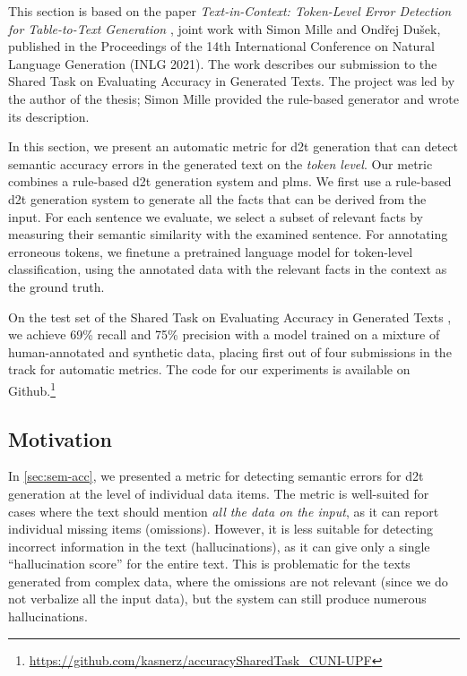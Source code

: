 \begin{refbox}
    This section is based on the paper \emph{Text-in-Context: Token-Level Error Detection for Table-to-Text Generation} \cite{kasnerTextinContextTokenLevelError2021}, joint work with Simon Mille and Ondřej Dušek, published in the Proceedings of the 14th International Conference on Natural Language Generation (INLG 2021). The work describes our submission to the Shared Task on Evaluating Accuracy in Generated Texts. The project was led by the author of the thesis; Simon Mille provided the rule-based generator and wrote its description.
\end{refbox}


In this section, we present an automatic metric for \ac{d2t} generation that can detect semantic accuracy errors in the generated text on the \emph{token level}. Our metric combines a rule-based \ac{d2t} generation system and \acp{plm}. We first use a rule-based \ac{d2t} generation system to generate all the facts that can be derived from the input. For each sentence we evaluate, we select a subset of relevant facts by measuring their semantic similarity with the examined sentence. For annotating erroneous tokens, we finetune a pretrained language model for token-level classification, using the annotated data with the relevant facts in the context as the ground truth.

On the test set of the Shared Task on Evaluating Accuracy in Generated Texts \cite{thomsonGenerationChallengesResults2021}, we achieve 69\% recall and 75\% precision with a model trained on a mixture of human-annotated and synthetic data, placing first out of four submissions in the track for automatic metrics. The code for our experiments is available on Github.\footnote{\url{https://github.com/kasnerz/accuracySharedTask_CUNI-UPF}}


\subsection{Motivation}
\label{sec:tok-acc:motivation}


In \autoref{sec:sem-acc}, we presented a metric for detecting semantic errors for \ac{d2t} generation at the level of individual data items. The metric is well-suited for cases where the text should mention \emph{all the data on the input}, as it can report individual missing items (omissions). However, it is less suitable for detecting incorrect information in the text (hallucinations), as it can give only a single ``hallucination score'' for the entire text. This is problematic for the texts generated from complex data, where the omissions are not relevant (since we do not verbalize all the input data), but the system can still produce numerous hallucinations.


